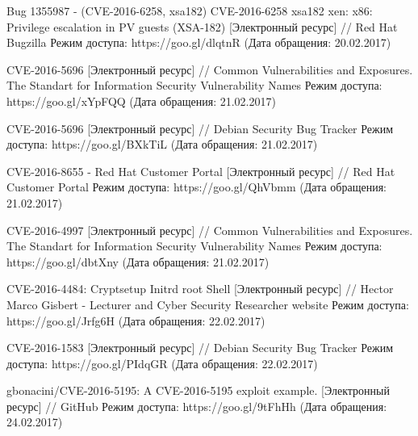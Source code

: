 \begin{thebibliography}{00}
    Bug 1355987 - (CVE-2016-6258, xsa182) CVE-2016-6258 xsa182 xen: x86: Privilege escalation in PV guests (XSA-182)
    [Электронный ресурс] //
    Red Hat Bugzilla
    Режим доступа: https://goo.gl/dlqtnR
    (Дата обращения: 20.02.2017)

    CVE-2016-5696
    [Электронный ресурс] //
    Common Vulnerabilities and Exposures. The Standart for Information Security Vulnerability Names
    Режим доступа: https://goo.gl/xYpFQQ
    (Дата обращения: 21.02.2017)

    CVE-2016-5696
    [Электронный ресурс] //
    Debian Security Bug Tracker
    Режим доступа: https://goo.gl/BXkTiL
    (Дата обращения: 21.02.2017)

    CVE-2016-8655 - Red Hat Customer Portal
    [Электронный ресурс] //
    Red Hat Customer Portal
    Режим доступа: https://goo.gl/QhVbmm
    (Дата обращения: 21.02.2017)

    CVE-2016-4997
    [Электронный ресурс] //
    Common Vulnerabilities and Exposures. The Standart for Information Security Vulnerability Names
    Режим доступа: https://goo.gl/dbtXny
    (Дата обращения: 21.02.2017)

    CVE-2016-4484: Cryptsetup Initrd root Shell
    [Электронный ресурс] //
    Hector Marco Gisbert - Lecturer and Cyber Security Researcher website
    Режим доступа: https://goo.gl/Jrfg6H
    (Дата обращения: 22.02.2017)

    CVE-2016-1583
    [Электронный ресурс] //
    Debian Security Bug Tracker
    Режим доступа: https://goo.gl/PIdqGR
    (Дата обращения: 22.02.2017)

    gbonacini/CVE-2016-5195: A CVE-2016-5195 exploit example.
    [Электронный ресурс] //
    GitHub
    Режим доступа: https://goo.gl/9tFhHh
    (Дата обращения: 24.02.2017)

\end{thebibliography}
\endgroup

\clearpage
